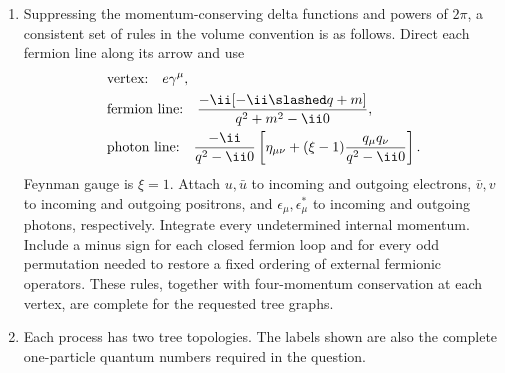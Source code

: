 \begin{enumerate}
\begin{enumerate}
\pagebreak[3]
\item
Suppressing the momentum-conserving delta functions and powers of \(2\pi\),
a consistent set of rules in the volume convention is as follows.  Direct
each fermion line along its arrow and use
\[
 \begin{split}
 &\text{vertex:}\quad e\gamma^\mu,\\
 &\text{fermion line:}\quad
 \frac{-\ii[-\ii\slashed q+m]}{q^2+m^2-\ii0},\\
 &\text{photon line:}\quad
 \frac{-\ii}{q^2-\ii0}
 \left[\eta_{\mu\nu}
+(\xi-1)\frac{q_\mu q_\nu}{q^2-\ii0}\right].
 \end{split}
\]
Feynman gauge is \(\xi=1\).  Attach \(u,\bar u\) to incoming and outgoing
electrons, \(\bar v,v\) to incoming and outgoing positrons, and
\(\epsilon_\mu,\epsilon_\mu^*\) to incoming and outgoing photons,
respectively.  Integrate every undetermined internal momentum.  Include a
minus sign for each closed fermion loop and for every odd permutation needed
to restore a fixed ordering of external fermionic operators.  These rules,
together with four-momentum conservation at each vertex, are complete for
the requested tree graphs.

\item
Each process has two tree topologies.  The labels shown are also the
complete one-particle quantum numbers required in the question.


\end{enumerate}
\end{enumerate}
